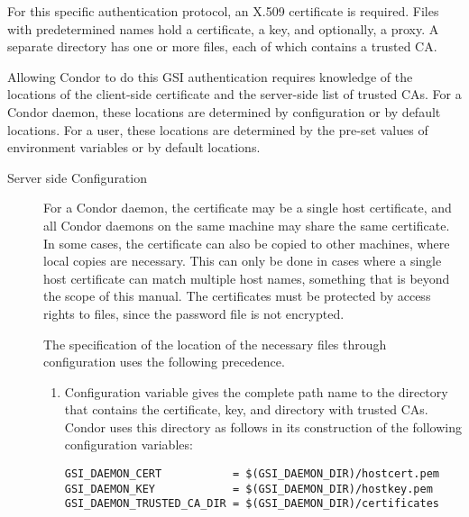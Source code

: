 For this specific authentication protocol,
an X.509 certificate is required.
Files with predetermined names hold a certificate,
a key, and optionally, a proxy.
A separate directory has one or more files, each of which contains
a trusted CA.

Allowing Condor to do this GSI authentication
requires knowledge of the locations of
the client-side certificate and the server-side list of
trusted CAs.
For a Condor daemon, these locations are determined
by configuration or by default locations.
For a user, these locations are determined by the
pre-set values of environment variables or by default locations.

\begin{description}
\item[Server side Configuration]

For a Condor daemon, the certificate may be a single host certificate,
and all Condor daemons on the same machine may share the same certificate.
In some cases, the certificate can also be copied to other machines,
where local copies are necessary.
This can only be done in cases where a single host certificate can
match multiple host names, something that is beyond the scope of this
manual. 
The certificates must be protected by access rights to files,
since the password file is not encrypted.


The specification of the location of the necessary files
through configuration uses the following precedence.
\begin{enumerate}
\item
Configuration variable  gives the complete
path name to the directory that contains the certificate, key,
and directory with trusted CAs.
Condor uses this directory as follows in its construction of the following
configuration variables:
\footnotesize
\begin{verbatim}
GSI_DAEMON_CERT           = $(GSI_DAEMON_DIR)/hostcert.pem
GSI_DAEMON_KEY            = $(GSI_DAEMON_DIR)/hostkey.pem 
GSI_DAEMON_TRUSTED_CA_DIR = $(GSI_DAEMON_DIR)/certificates 
\end{verbatim}


\end{enumerate}
\end{description}
